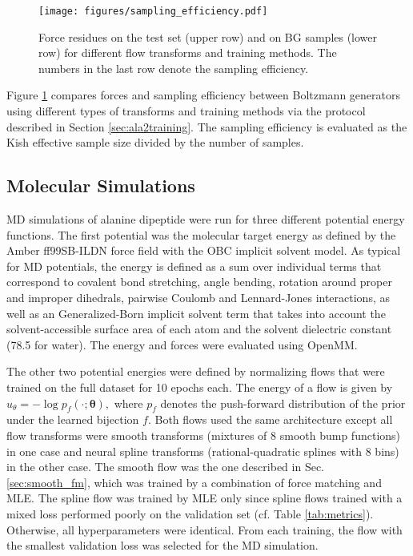 \documentclass{article}
\newcommand{\jonas}[1]{{\color{red} \textbf{jonas:} #1}}
\begin{document}
\begin{figure}[htbp]
    \centering
    \texttt{[image: figures/sampling\_efficiency.pdf]}
    \caption{Force residues on the test set (upper row) and on BG samples (lower row) for different flow transforms and training methods. The numbers in the last row denote the sampling efficiency. \label{fig:forces_se}}
\end{figure}

Figure \ref{fig:forces_se} compares forces and sampling efficiency between Boltzmann generators using different types of transforms and training methods via the protocol described in Section \ref{sec:ala2training}.
The sampling efficiency is evaluated as the Kish effective sample size divided by the number of samples.


\subsection{Molecular Simulations}
MD simulations of alanine dipeptide were run for three different potential energy functions. The first potential was the molecular target energy as defined by the Amber ff99SB-ILDN force field with the OBC implicit solvent model. As typical for MD potentials, the energy is defined as a sum over individual terms that correspond to covalent bond stretching, angle bending, rotation around proper and improper dihedrals, pairwise Coulomb and Lennard-Jones interactions, as well as an Generalized-Born implicit solvent term that takes into account the solvent-accessible surface area of each atom and the solvent dielectric constant (78.5 for water). The energy and forces were evaluated using OpenMM. 


The other two potential energies were defined by normalizing flows that were trained on the full dataset for 10 epochs each. The energy of a flow is given by $u_\theta = -\log p_f(\cdot; \bm{\theta}),$ where $p_f$ denotes the push-forward distribution of the prior under the learned bijection $f.$ Both flows used the same architecture except all flow transforms were smooth transforms (mixtures of 8 smooth bump functions) in one case and neural spline transforms (rational-quadratic splines \cite{rezende2020normalizing, wirnsberger2020targeted} with 8 bins) in the other case. 
The smooth flow was the one described in Sec. \ref{sec:smooth_fm}, which was trained by a combination of force matching and MLE. The spline flow was trained by MLE only since spline flows trained with a mixed loss performed poorly on the validation set (cf. Table \ref{tab:metrics}). Otherwise, all hyperparameters were identical. From each training, the flow with the smallest validation loss was selected for the MD simulation.
\end{document}
